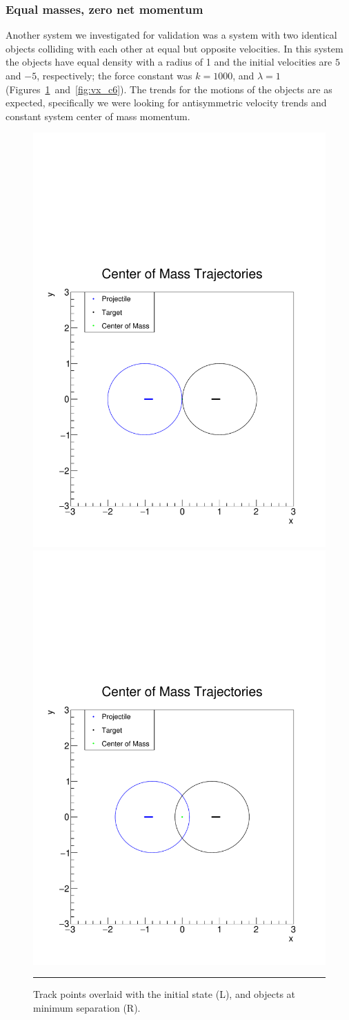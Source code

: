 \documentclass[aps,prl,floatfix,preprint,nofootinbib]{revtex4}
\begin{document}
\subsubsection{Equal masses, zero net momentum}
Another system we investigated for validation was a system with two identical objects colliding with each other at equal but opposite velocities. In this system the objects have equal density with a radius of 1 and the initial velocities are $5$ and $-5$, respectively; the force constant was $k = 1000$, and $\lambda = 1$ (Figures~\ref{fig:tracks_c6}~and~\ref{fig:vx_c6}). The trends for the motions of the objects are as expected, specifically we were looking for antisymmetric velocity trends and constant system center of mass momentum.
\begin{figure}[h!]
  \includegraphics[width=.45\textwidth]{plots/out_c6/x_vs_y_with_ellipse.pdf}
  \includegraphics[width=.45\textwidth]{plots/out_c6/x_vs_y_with_ellipse_MS.pdf}
                  {\par\nobreak\rule[9pt]{35em}{0.5pt}\vspace{-5mm}}
                  \caption{Track points overlaid with the initial state (L), and objects at minimum separation (R).}
                  \label{fig:tracks_c6}
\end{figure}
\end{document}
